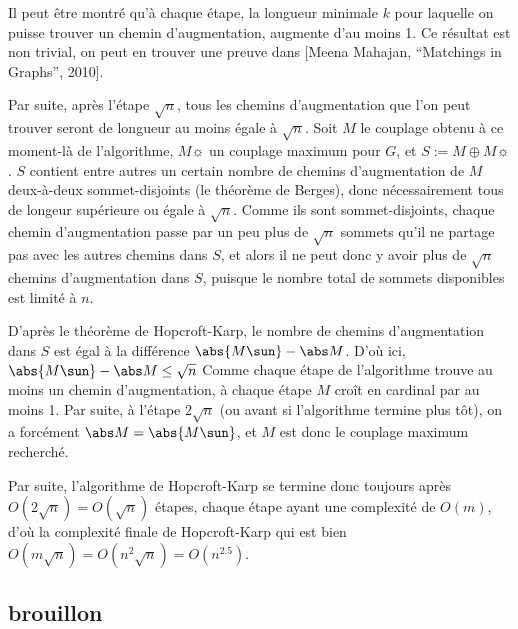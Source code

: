  Il peut être montré qu'à chaque étape, la longueur minimale $k$ pour laquelle on puisse trouver un chemin d'augmentation, augmente d'au moins 1. Ce résultat est non trivial, on peut en trouver une preuve dans [Meena Mahajan, ``Matchings in Graphs'', 2010].
 
 Par suite, après l'étape $\sqrt n$, tous les chemins d'augmentation que l'on peut trouver seront de longueur au moins égale à $\sqrt n$. Soit $M$ le couplage obtenu à ce moment-là de l'algorithme, $M\sun$ un couplage maximum pour $G$, et $S := M \oplus M\sun$. $S$ contient entre autres un certain nombre de chemins d'augmentation de $M$ deux-à-deux sommet-disjoints (\cf le théorème de Berges), donc nécessairement tous de longeur supérieure ou égale à $\sqrt n$. Comme ils sont sommet-disjoints, chaque chemin d'augmentation passe par un peu plus de $\sqrt n$ sommets qu'il ne partage pas avec les autres chemins dans $S$, et alors il ne peut donc y avoir plus de $\sqrt n$ chemins d'augmentation dans $S$, puisque le nombre total de sommets disponibles est limité à $n$.
 
 D'après le théorème de Hopcroft-Karp, le nombre de chemins d'augmentation dans $S$ est égal à la différence $\abs {M\sun} - \abs M$. D'où ici, $\abs {M\sun} - \abs M \leq \sqrt n$ Comme chaque étape de l'algorithme trouve au moins un chemin d'augmentation, à chaque étape $M$ croît en cardinal par au moins 1. Par suite, à l'étape $2 \sqrt n$ (ou avant si l'algorithme termine plus tôt), on a forcément $\abs M = \abs {M\sun}$, et $M$ est donc le couplage maximum recherché.
 
 Par suite, l'algorithme de Hopcroft-Karp se termine donc toujours après $O(2\sqrt n) = O(\sqrt n)$ étapes, chaque étape ayant une complexité de $O(m)$, d'où la complexité finale de Hopcroft-Karp qui est bien $O(m \sqrt n) = O(n^2 \sqrt n) = O(n^{2.5})$.
 
 \subsection{brouillon}
 


